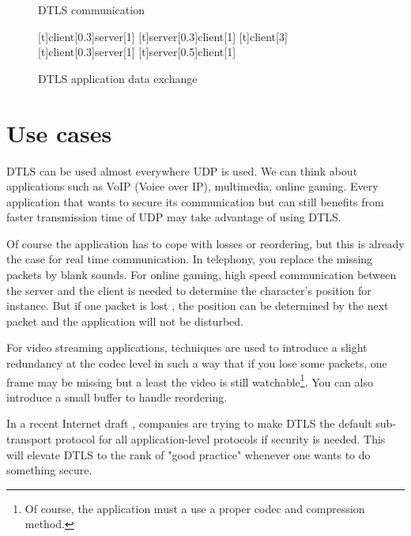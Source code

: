 \begin{figure}[!h]
\centering
\begin{msc}[r]{DTLS communication}

\setlength{\instfootheight}{0em}
\setlength{\instheadheight}{0em}
\setlength{\instdist}{0.7\linewidth}
\setlength{\levelheight}{3em}


[t]{client}[0.3]{server}[1]
\nextlevel
{}[t]{server}[0.3]{client}[1]
\nextlevel
\nextlevel
{}[t]{}{client}[3]
\nextlevel
{}[t]{client}[0.3]{server}[1]
\nextlevel
{}[t]{server}[0.5]{client}[1]
\nextlevel
\nextlevel
\end{msc}
\caption{DTLS application data exchange}
\label{fig:dtls-data}
\end{figure}

\section{Use cases}

\label{sec:dtls-usage}

DTLS can be used almost everywhere UDP is used. We can think about applications such as VoIP (Voice over IP), multimedia, online gaming. Every application that wants to secure its communication but can still benefits from faster transmission time of UDP may take advantage of using DTLS.

Of course the application has to cope with losses or reordering, but this is already the case for real time communication. In telephony, you replace the missing packets by blank sounds. For online gaming, high speed communication between the server and the client is needed to determine the character's position for instance. But if one packet is lost , the position can be determined by the next packet and the application will not be disturbed.

For video streaming applications, techniques are used to introduce a slight redundancy at the codec level in such a way that if you lose some packets, one frame may be missing but a least the video is still watchable\footnote{Of course, the application must a use a proper codec and compression method.}. You can also introduce a small buffer to handle reordering.

In a recent Internet draft \cite{dtls-as-subtransport}, companies are trying to make DTLS the default sub-transport protocol for all application-level protocols if security is needed. This will elevate DTLS to the rank of "good practice" whenever one wants to do something secure. 


